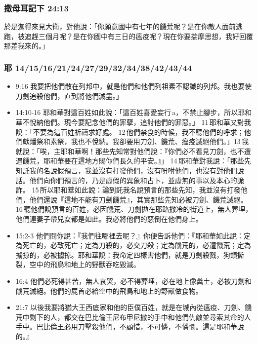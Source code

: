 \subsubsection{撒母耳記下 24:13}
於是迦得來見大衛，對他說：「你願意國中有七年的饑荒呢？是在你敵人面前逃跑，被追趕三個月呢？是在你國中有三日的瘟疫呢？現在你要揣摩思想，我好回覆那差我來的。」

\subsubsection{耶 14/15/16/21/24/27/29/32/34/38/42/43/44}
\begin{itemize}

\item 9:16 我要把他們散在列邦中，就是他們和他們列祖素不認識的列邦。我也要使刀劍追殺他們，直到將他們滅盡。」


\item 14:10-16
耶和華對這百姓如此說：「這百姓喜愛妄行 a，不禁止腳步，所以耶和華不悅納他們。現今要記念他們的罪孽，追討他們的罪惡。」 11 耶和華又對我說：「不要為這百姓祈禱求好處。 12 他們禁食的時候，我不聽他們的呼求；他們獻燔祭和素祭，我也不悅納。我卻要用刀劍、饑荒、瘟疫滅絕他們。」13 我就說：「唉，主耶和華啊！那些先知常對他們說：『你們必不看見刀劍，也不遭遇饑荒，耶和華要在這地方賜你們長久的平安。』」 14 耶和華對我說：「那些先知託我的名說假預言，我並沒有打發他們，沒有吩咐他們，也沒有對他們說話。他們向你們預言的，乃是虛假的異象和占卜，並虛無的事以及本心的詭詐。 15 所以耶和華如此說：論到託我名說預言的那些先知，我並沒有打發他們，他們還說『這地不能有刀劍饑荒』，其實那些先知必被刀劍、饑荒滅絕。 16 聽他們說預言的百姓，必因饑荒、刀劍拋在耶路撒冷的街道上，無人葬埋，他們連妻子帶兒女都是如此。我必將他們的惡倒在他們身上。

\item 15:2-3
他們問你說：『我們往哪裡去呢？』你便告訴他們：『耶和華如此說：定為死亡的，必致死亡；定為刀殺的，必交刀殺；定為饑荒的，必遭饑荒；定為擄掠的，必被擄掠。耶和華說：我命定四樣害他們，就是刀劍殺戮，狗類撕裂，空中的飛鳥和地上的野獸吞吃毀滅。

\item 16:4
他們必死得甚苦，無人哀哭，必不得葬埋，必在地上像糞土，必被刀劍和饑荒滅絕。他們的屍首必給空中的飛鳥和地上的野獸做食物。

\item 21:7
以後我要將猶大王西底家和他的臣僕百姓，就是在城內從瘟疫、刀劍、饑荒中剩下的人，都交在巴比倫王尼布甲尼撒的手中和他們仇敵並尋索其命的人手中。巴比倫王必用刀擊殺他們，不顧惜，不可憐，不憐憫。這是耶和華說的。』


\end{itemize}
